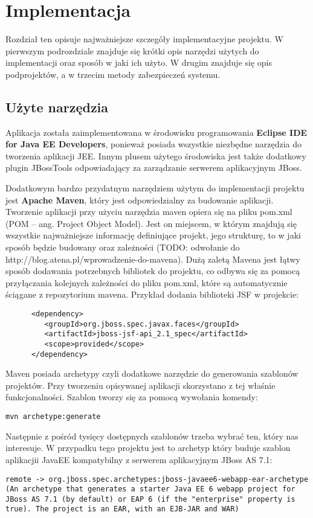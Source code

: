 \chapter{Implementacja}
\label{cha:implementacja}
Rozdział ten opisuje najważniejsze szczegóły implementacyjne projektu. W pierwszym podrozdziale znajduje się krótki opis narzędzi użytych do implementacji oraz sposób w jaki ich użyto. W drugim znajduje się opis podprojektów, a w trzecim metody zabezpieczeń systemu.
\section{Użyte narzędzia}
Aplikacja została zaimplementowana w środowisku programowania \textbf{Eclipse IDE for Java EE Developers}, ponieważ posiada wszystkie niezbędne narzędzia do tworzenia aplikacji JEE. Innym plusem użytego środowiska jest także dodatkowy plugin JBossTools odpowiadający za zarządzanie serwerem aplikacyjnym JBoss.

Dodatkowym bardzo przydatnym narzędziem użytym do implementacji projektu jest \textbf{Apache Maven}, który jest odpowiedzialny za budowanie aplikacji. Tworzenie aplikacji przy użyciu narzędzia maven opiera się na pliku pom.xml (POM – ang. Project Object Model). Jest on miejscem, w którym znajdują się wszystkie najważniejsze informację definiujące projekt, jego strukturę, to w jaki sposób będzie budowany oraz zależności (TODO: odwołanie do http://blog.atena.pl/wprowadzenie-do-mavena). Dużą zaletą Mavena jest łątwy sposób dodawania potrzebnych bibliotek do projektu, co odbywa się za pomocą przyłączania kolejnych zależności do pliku pom.xml, które są automatycznie ściągane z repozytorium mavena. Przykład dodania biblioteki JSF w projekcie:
\begin{lstlisting}
      <dependency>
         <groupId>org.jboss.spec.javax.faces</groupId>
         <artifactId>jboss-jsf-api_2.1_spec</artifactId>
         <scope>provided</scope>
      </dependency>
\end{lstlisting}
Maven posiada archetypy czyli dodatkowe narzędzie do generowania szablonów projektów. Przy tworzeniu opisywanej aplikacji skorzystano z tej właśnie funkcjonalności. Szablon tworzy się za pomocą wywołania komendy:
\begin{lstlisting}
mvn archetype:generate 
\end{lstlisting}
Następnie z pośród tysięcy dostępnych szablonów trzeba wybrać ten, który nas interesuje. W przypadku tego projektu jest to archetyp który buduje szablon aplikacjii JavaEE kompatybilny z serwerem aplikacyjnym JBoss AS 7.1:
\begin{lstlisting}[breaklines=true]
remote -> org.jboss.spec.archetypes:jboss-javaee6-webapp-ear-archetype (An archetype that generates a starter Java EE 6 webapp project for JBoss AS 7.1 (by default) or EAP 6 (if the "enterprise" property is true). The project is an EAR, with an EJB-JAR and WAR)
\end{lstlisting}

